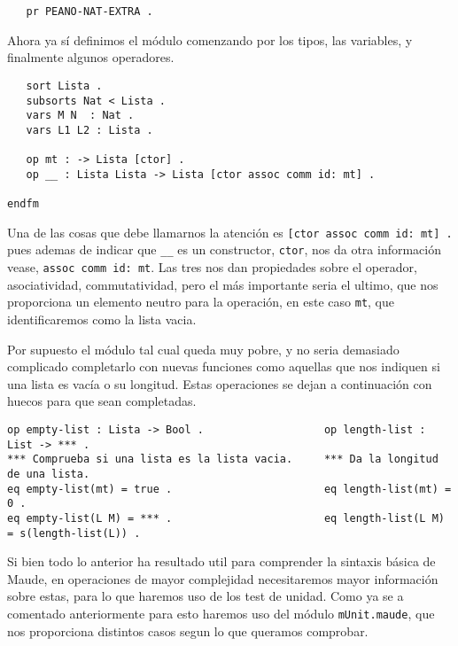 {\codesize
\begin{verbatim}
   pr PEANO-NAT-EXTRA .
\end{verbatim}
}

Ahora ya sí definimos el módulo comenzando por los tipos, las variables, y finalmente algunos operadores. \par

{\codesize
\begin{verbatim}
   sort Lista .
   subsorts Nat < Lista .
   vars M N  : Nat .
   vars L1 L2 : Lista .	

   op mt : -> Lista [ctor] .
   op __ : Lista Lista -> Lista [ctor assoc comm id: mt] .

endfm
\end{verbatim}
}

Una de las cosas que debe llamarnos la atención es \verb"[ctor assoc comm id: mt] ." pues ademas de indicar que \verb"__" es un constructor, \texttt{ctor}, nos da otra información vease, \texttt{assoc comm id: mt}. Las tres nos dan propiedades sobre el operador, asociatividad, commutatividad, pero el más importante seria el ultimo, que nos proporciona un elemento neutro para la operación, en este caso \texttt{mt}, que identificaremos como la lista vacia. \par

Por supuesto el módulo tal cual queda muy pobre, y no seria demasiado complicado completarlo con nuevas funciones como aquellas que nos indiquen si una lista es vacía o su longitud. Estas operaciones se dejan a continuación con huecos para que sean completadas. \par

{\codesize
\begin{verbatim}
op empty-list : Lista -> Bool .                   op length-list : List -> *** .
*** Comprueba si una lista es la lista vacia.     *** Da la longitud de una lista.
eq empty-list(mt) = true .                        eq length-list(mt) = 0 .
eq empty-list(L M) = *** .                        eq length-list(L M) = s(length-list(L)) .
\end{verbatim}
}

Si bien todo lo anterior ha resultado util para comprender la sintaxis básica de Maude, en operaciones de mayor complejidad necesitaremos mayor información sobre estas, para lo que haremos uso de los test de unidad. Como ya se a comentado anteriormente para esto haremos uso del módulo \texttt{mUnit.maude}, que nos proporciona distintos casos segun lo que queramos comprobar.\par

